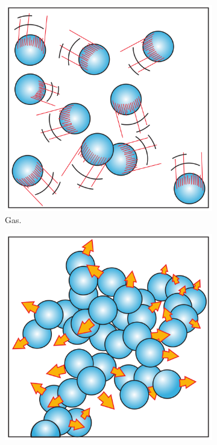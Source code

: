 \begin{figure}[h]
     \centering
     \begin{subfigure}[b]{0.3\textwidth}
         \centering
         \includegraphics[width=\textwidth]{Chapitre_2/Images/gas.png}
         \caption{Gas.}
         \label{fig:C2_gas}
     \end{subfigure}
     \begin{subfigure}[b]{0.3\textwidth}
         \centering
         \includegraphics[width=\textwidth]{Chapitre_2/Images/liquid.png}

\end{subfigure}
\end{figure}
